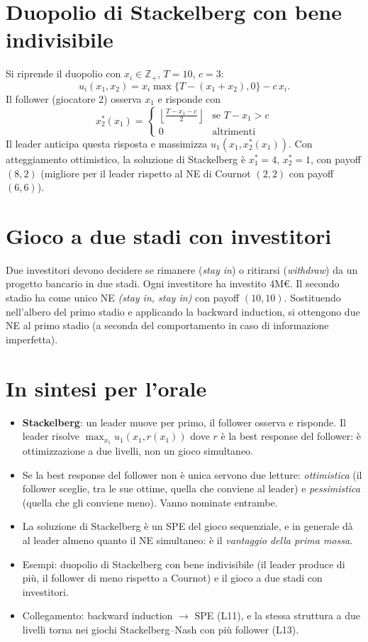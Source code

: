 \documentclass[12pt,a4paper,twoside]{book}
\theoremstyle{plain}
\theoremstyle{definition}
\begin{document}
\section{Duopolio di Stackelberg con bene indivisibile}

Si riprende il duopolio con $x_i\in\mathbb{Z}_+$, $T=10$, $c=3$:
\[
  u_i(x_1,x_2) = x_i\max\{T-(x_1+x_2),0\} - c\,x_i.
\]
Il follower (giocatore 2) osserva $x_1$ e risponde con
\[
  x_2^*(x_1) = \begin{cases}
    \displaystyle\left\lfloor\frac{T-x_1-c}{2}\right\rfloor & \text{se }T-x_1>c \\
    0 & \text{altrimenti}
  \end{cases}
\]
Il leader anticipa questa risposta e massimizza $u_1(x_1, x_2^*(x_1))$. Con atteggiamento ottimistico, la soluzione di Stackelberg è $x_1^*=4$, $x_2^*=1$, con payoff $(8,2)$ (migliore per il leader rispetto al NE di Cournot $(2,2)$ con payoff $(6,6)$).

\section{Gioco a due stadi con investitori}

Due investitori devono decidere se rimanere (\emph{stay in}) o ritirarsi (\emph{withdraw}) da un progetto bancario in due stadi. Ogni investitore ha investito 4M€. Il secondo stadio ha come unico NE \emph{(stay in, stay in)} con payoff $(10,10)$. Sostituendo nell'albero del primo stadio e applicando la backward induction, si ottengono due NE al primo stadio (a seconda del comportamento in caso di informazione imperfetta).

\section*{In sintesi per l'orale}
\begin{itemize}
  \item \textbf{Stackelberg}: un leader muove per primo, il follower osserva e risponde. Il leader risolve $\max_{x_1} u_1(x_1, r(x_1))$ dove $r$ è la best response del follower: è ottimizzazione a due livelli, non un gioco simultaneo.
  \item Se la best response del follower non è unica servono due letture: \emph{ottimistica} (il follower sceglie, tra le sue ottime, quella che conviene al leader) e \emph{pessimistica} (quella che gli conviene meno). Vanno nominate entrambe.
  \item La soluzione di Stackelberg è un SPE del gioco sequenziale, e in generale dà al leader almeno quanto il NE simultaneo: è il \emph{vantaggio della prima mossa}.
  \item Esempi: duopolio di Stackelberg con bene indivisibile (il leader produce di più, il follower di meno rispetto a Cournot) e il gioco a due stadi con investitori.
  \item Collegamento: backward induction $\to$ SPE (L11), e la stessa struttura a due livelli torna nei giochi Stackelberg--Nash con più follower (L13).
\end{itemize}
\end{document}
